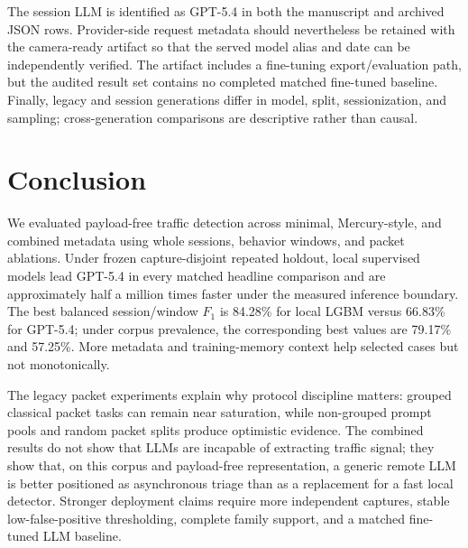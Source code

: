 \documentclass[letterpaper,twocolumn,10pt]{article}
\begin{document}
The session LLM is identified as GPT-5.4 in both the manuscript and archived JSON rows. Provider-side request metadata should nevertheless be retained with the camera-ready artifact so that the served model alias and date can be independently verified. The artifact includes a fine-tuning export/evaluation path, but the audited result set contains no completed matched fine-tuned baseline. Finally, legacy and session generations differ in model, split, sessionization, and sampling; cross-generation comparisons are descriptive rather than causal.


\section{Conclusion}
\label{sec:conclusion}

We evaluated payload-free traffic detection across minimal, Mercury-style, and combined metadata using whole sessions, behavior windows, and packet ablations. Under frozen capture-disjoint repeated holdout, local supervised models lead GPT-5.4 in every matched headline comparison and are approximately half a million times faster under the measured inference boundary. The best balanced session/window $F_1$ is 84.28\% for local LGBM versus 66.83\% for GPT-5.4; under corpus prevalence, the corresponding best values are 79.17\% and 57.25\%. More metadata and training-memory context help selected cases but not monotonically.

The legacy packet experiments explain why protocol discipline matters: grouped classical packet tasks can remain near saturation, while non-grouped prompt pools and random packet splits produce optimistic evidence. The combined results do not show that LLMs are incapable of extracting traffic signal; they show that, on this corpus and payload-free representation, a generic remote LLM is better positioned as asynchronous triage than as a replacement for a fast local detector. Stronger deployment claims require more independent captures, stable low-false-positive thresholding, complete family support, and a matched fine-tuned LLM baseline.

\end{document}
